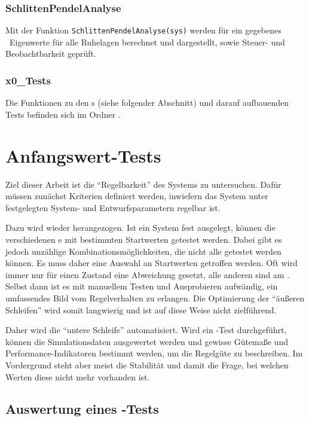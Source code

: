 \subsubsection{SchlittenPendelAnalyse}

Mit der Funktion \texttt{SchlittenPendelAnalyse(sys)} werden für ein gegebenes \zrm\ Eigenwerte für alle Ruhelagen berechnet und dargestellt, sowie Steuer- und Beobachtbarkeit geprüft.

\subsubsection{x0\_Tests}
Die Funktionen zu den \xots s (siehe folgender Abschnitt) und darauf aufbauenden Tests befinden sich im Ordner .




\section{Anfangswert-Tests}\label{sec:x0test}

Ziel dieser Arbeit ist die "`Regelbarkeit"' des Systems zu untersuchen.
Dafür müssen zunächst Kriterien definiert werden, inwiefern das System unter festgelegten System- und Entwurfsparametern regelbar ist.

Dazu wird wieder  herangezogen.
Ist ein System fest ausgelegt, können die verschiedenen \ap e mit bestimmten Startwerten getestet werden.
Dabei gibt es jedoch unzählige Kombinationsmöglichkeiten, die nicht alle getestet werden können.
Es muss daher eine Auswahl an Startwerten getroffen werden.
Oft wird immer nur für einen Zustand eine Abweichung gesetzt, alle anderen sind am \ap.
Selbst dann ist es mit manuellem Testen und Ausprobieren aufwändig, ein umfassendes Bild vom Regelverhalten zu erlangen.
Die Optimierung der "`äußeren Schleifen"' wird somit langwierig und ist auf diese Weise nicht zielführend.

Daher wird die "`untere Schleife"' automatisiert.
Wird ein \ap-Test durchgeführt, können die Simulationsdaten ausgewertet werden und gewisse Gütemaße und Performance-Indikatoren bestimmt werden, um die Regelgüte zu beschreiben.
Im Vordergrund steht aber meist die Stabilität und damit die Frage, bei welchen Werten diese nicht mehr vorhanden ist.


\subsection{Auswertung eines \ap-Tests}\label{subsec:x0ausw}

